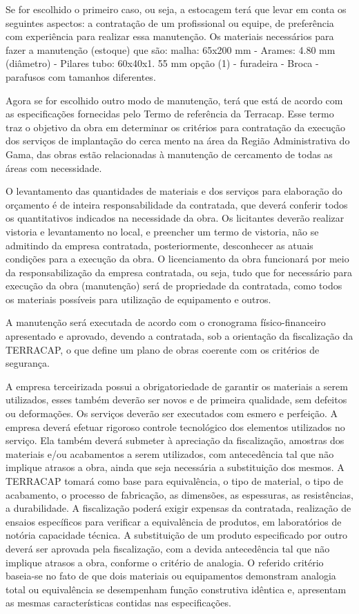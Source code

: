 	Se for escolhido o primeiro caso, ou seja, a estocagem terá que levar em conta os seguintes aspectos: a contratação de um profissional ou equipe, de preferência com experiência para realizar essa manutenção. Os materiais necessários para fazer a manutenção (estoque) que são: malha: 65x200 mm - Arames: 4.80 mm (diâmetro) - Pilares tubo: 60x40x1. 55 mm  opção (1) - furadeira - Broca - parafusos com tamanhos diferentes.
	
	Agora se for escolhido outro modo de manutenção, terá que está de acordo com as especificações fornecidas pelo Termo de referência da Terracap. Esse termo traz o objetivo da obra em determinar os critérios para contratação da execução dos serviços de implantação do cerca mento na área da Região Administrativa do Gama, das obras estão relacionadas à manutenção de cercamento de todas as áreas com necessidade.
	
	O levantamento das quantidades de materiais e dos serviços para elaboração do orçamento é de inteira responsabilidade da  contratada, que deverá conferir todos os quantitativos indicados na necessidade da obra. Os licitantes deverão realizar vistoria e levantamento no local, e preencher um termo de vistoria, não se admitindo da empresa contratada, posteriormente, desconhecer as atuais condições para a execução da obra.
O licenciamento da obra funcionará por meio da responsabilização da empresa contratada, ou seja, tudo que for necessário para execução da obra (manutenção) será de propriedade da contratada, como todos os materiais possíveis para utilização de equipamento e outros. 
 
	A manutenção será executada de acordo com o cronograma físico-financeiro apresentado e aprovado, devendo a contratada, sob a orientação da fiscalização da TERRACAP, o que define um plano de obras coerente com os critérios de segurança.
	
	A empresa terceirizada possui a obrigatoriedade de garantir os materiais a serem utilizados, esses também deverão ser novos e de primeira qualidade, sem defeitos ou deformações. Os serviços deverão ser executados com esmero e perfeição. A empresa deverá efetuar rigoroso controle tecnológico dos elementos utilizados no serviço.  Ela também deverá submeter à apreciação da fiscalização, amostras dos materiais e/ou acabamentos a serem utilizados, com antecedência tal que não implique atrasos a obra, ainda que seja necessária a substituição dos mesmos.  
A TERRACAP tomará como base para equivalência, o tipo de material, o tipo de acabamento, o processo de fabricação, as dimensões, as espessuras, as resistências, a durabilidade. A fiscalização poderá exigir expensas da contratada, realização de ensaios específicos para verificar a equivalência de produtos, em laboratórios de notória capacidade técnica.  A substituição de um produto especificado por outro deverá ser aprovada pela fiscalização, com a devida antecedência tal que não implique atrasos a obra, conforme o critério de analogia. O referido critério baseia-se no fato de que dois materiais ou equipamentos demonstram analogia total ou equivalência se desempenham função construtiva idêntica e, apresentam as mesmas características contidas nas especificações.

